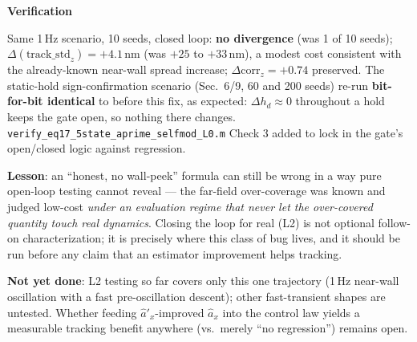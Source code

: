 \documentclass[11pt,a4paper,fontset=none]{ctexart}
\newcommand{\lbl}[1]{\par\smallskip\noindent\textbf{#1}\par\nobreak\vspace{0.2ex}}
\begin{document}
\lbl{Verification} Same 1\,Hz scenario, 10 seeds, closed loop: \textbf{no divergence} (was 1 of 10 seeds); $\Delta(\text{track\_std}_z)=+4.1$\,nm (was $+25$ to $+33$\,nm), a modest cost consistent with the already-known near-wall spread increase; $\Delta\mathrm{corr}_z=+0.74$ preserved. The static-hold sign-confirmation scenario (Sec.~6/9, 60 and 200 seeds) re-run \textbf{bit-for-bit identical} to before this fix, as expected: $\Delta h_d\approx0$ throughout a hold keeps the gate open, so nothing there changes. \texttt{verify\_eq17\_5state\_aprime\_selfmod\_L0.m} Check 3 added to lock in the gate's open/closed logic against regression.

\textbf{Lesson}: an ``honest, no wall-peek'' formula can still be wrong in a way pure open-loop testing cannot reveal --- the far-field over-coverage was known and judged low-cost \emph{under an evaluation regime that never let the over-covered quantity touch real dynamics}. Closing the loop for real (L2) is not optional follow-on characterization; it is precisely where this class of bug lives, and it should be run before any claim that an estimator improvement helps tracking.

\textbf{Not yet done}: L2 testing so far covers only this one trajectory (1\,Hz near-wall oscillation with a fast pre-oscillation descent); other fast-transient shapes are untested. Whether feeding $\hat a'_x$-improved $\hat a_x$ into the control law yields a measurable tracking benefit anywhere (vs.\ merely ``no regression'') remains open.
\end{document}
